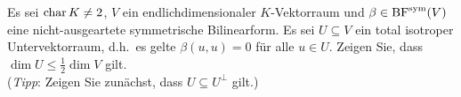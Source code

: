 \documentclass[a4paper, 10pt]{scrartcl}
\begin{document}










\begin{question}[subtitle = Total isotrope Untervektorräume]
  Es sei $\operatorname{char} K \neq 2$, $V$ ein endlichdimensionaler $K$-Vektorraum und $\beta \in \operatorname{BF}^{\operatorname{sym}}(V)$ eine nicht-ausgeartete symmetrische Bilinearform.
  Es sei $U \subseteq V$ ein total isotroper Untervektorraum, d.h.\ es gelte $\beta(u,u) = 0$ für alle $u \in U$.
  Zeigen Sie, dass $\dim U \leq \frac{1}{2} \dim V$ gilt.
  \\
  (\emph{Tipp}:
   Zeigen Sie zunächst, dass $U \subseteq U^\perp$ gilt.)
\end{question}
\end{document}
